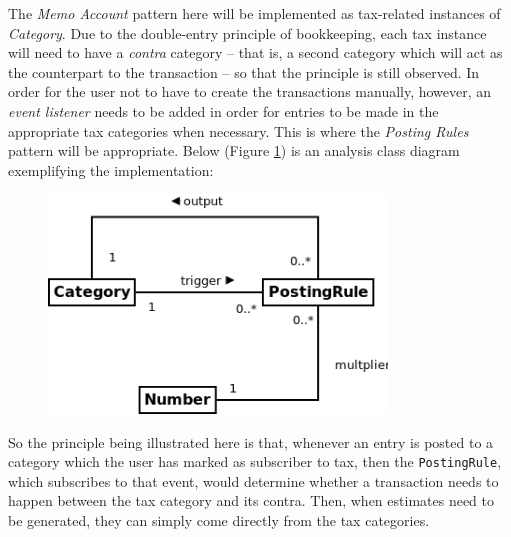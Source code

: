 The \emph{Memo Account} pattern here will be implemented as tax-related
instances of \emph{Category}. Due to the double-entry principle of bookkeeping,
each tax instance will need to have a \emph{contra} category -- that is, a
second category which will act as the counterpart to the transaction -- so that
the principle is still observed.  In order for the user not to have to create
the transactions manually, however, an \emph{event listener} needs to be added
in order for entries to be made in the appropriate tax categories when
necessary. This is where the \emph{Posting Rules} pattern will be appropriate.
Below (Figure \ref{fig:ClassDiagram.Memo_Categories_and_Posting_Rule}) is an
analysis class diagram exemplifying the implementation:
\begin{figure}[ht!]
  \begin{center}
    \includegraphics[width=9cm]{./contents/img/Class_Diagram_-_Memo_Categories_and_Posting_Rule.png}
  \end{center}
  \caption{}
  \label{fig:ClassDiagram.Memo_Categories_and_Posting_Rule}
\end{figure}
\FloatBarrier

So the principle being illustrated here is that, whenever an entry is posted to
a category which the user has marked as subscriber to tax, then the
\texttt{PostingRule}, which subscribes to that event, would determine whether a
transaction needs to happen between the tax category and its contra. Then, when
estimates need to be generated, they can simply come directly from the tax
categories.
